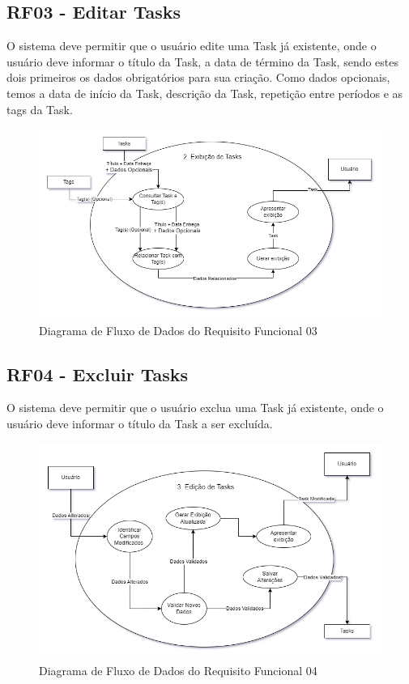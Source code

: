 \documentclass[a4paper,12pt]{article}
\begin{document}
\pagebreak
\subsection{RF03 - Editar Tasks}
O sistema deve permitir que o usuário edite uma {Task} já existente, onde o usuário deve informar o 
título da {Task}, a data de término da {Task}, sendo estes dois primeiros os dados obrigatórios 
para sua criação. Como dados opcionais, temos a data de início da {Task}, descrição da {Task}, 
repetição entre períodos e as tags da {Task}.
\begin{figure}[H]
	\centering
	\includegraphics[scale=0.45]{DFDs/RF02.drawio.png}
	\caption{Diagrama de Fluxo de Dados do Requisito Funcional 03}
\end{figure}

\pagebreak
\subsection{RF04 - Excluir Tasks}
O sistema deve permitir que o usuário exclua uma {Task} já existente, onde o usuário deve informar o título 
da {Task} a ser excluída.
\begin{figure}[H]
	\centering
	\includegraphics[scale=0.45]{DFDs/RF03.drawio.png}
	\caption{Diagrama de Fluxo de Dados do Requisito Funcional 04}
\end{figure}
\end{document}
